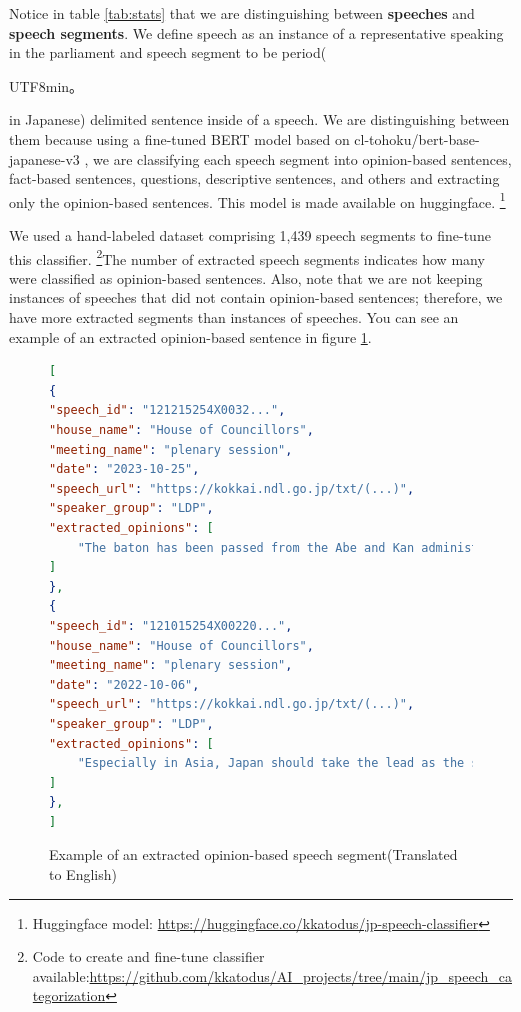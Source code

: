 \documentclass[final,5p,times,twocolumn,authoryear]{elsarticle}
\begin{document}
Notice in table \ref{tab:stats} that we are distinguishing between \textbf{speeches} and \textbf{speech segments}. We define speech as an instance of a representative speaking in the parliament and speech segment to be period(\begin{CJK}{UTF8}{min}。\end{CJK}in Japanese) delimited sentence inside of a speech. We are distinguishing between them because using a fine-tuned BERT model based on cl-tohoku/bert-base-japanese-v3 \citep{Tohoku}, we are classifying each speech segment into opinion-based sentences, fact-based sentences, questions, descriptive sentences, and others and extracting only the opinion-based sentences. This model is made available on huggingface. \footnote{Huggingface model: \url{https://huggingface.co/kkatodus/jp-speech-classifier}} 

We used a hand-labeled dataset comprising 1,439 speech segments to fine-tune this classifier. \footnote{Code to create and fine-tune classifier available:\url{https://github.com/kkatodus/AI_projects/tree/main/jp_speech_categorization}}The number of extracted speech segments indicates how many were classified as opinion-based sentences. Also, note that we are not keeping instances of speeches that did not contain opinion-based sentences; therefore, we have more extracted segments than instances of speeches. You can see an example of an extracted opinion-based sentence in figure \ref{fig:extracted opinion}.
\begin{figure}

\begin{lstlisting}[language=json,firstnumber=1]
[
{
"speech_id": "121215254X0032...",
"house_name": "House of Councillors",
"meeting_name": "plenary session",
"date": "2023-10-25",
"speech_url": "https://kokkai.ndl.go.jp/txt/(...)",
"speaker_group": "LDP",
"extracted_opinions": [
	"The baton has been passed from the Abe and Kan administrations, which took a ..."
]
},
{
"speech_id": "121015254X00220...",
"house_name": "House of Councillors",
"meeting_name": "plenary session",
"date": "2022-10-06",
"speech_url": "https://kokkai.ndl.go.jp/txt/(...)",
"speaker_group": "LDP",
"extracted_opinions": [
	"Especially in Asia, Japan should take the lead as the standard-bearer of freedom and democracy, showing firmness in both security and economy."
]
},
]
\end{lstlisting}
\caption{Example of an extracted opinion-based speech segment(Translated to English)}
\label{fig:extracted opinion}
\end{figure}
\end{document}
